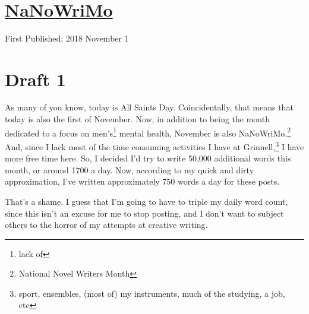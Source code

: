 \documentclass[12pt]{article}[titlepage]
\newcommand{\1}{\={a}}
\newcommand{\2}{\={e}}
\newcommand{\3}{\={\i}}
\newcommand{\4}{\=o}
\newcommand{\5}{\=u}
\newcommand{\6}{\={A}}
\renewcommand{\,}{\textsuperscript{,}}
\begin{document}

\doublespacing
\section{\href{nanowrimo.html}{NaNoWriMo}}
First Published: 2018 November 1
\section{Draft 1}
As many of you know, today is All Saints Day.
Coincidentally, that means that today is also the first of November.
Now, in addition to being the month dedicated to a focus on men's\footnote{lack of} mental health, November is also NaNoWriMo.\footnote{National Novel Writers Month}
And, since I lack most of the time consuming activities I have at Grinnell,\footnote{sport, ensembles, (most of) my instruments, much of the studying, a job, etc} I have more free time here.
So, I  decided I'd try to write 50,000 additional words this month, or around 1700 a day.
Now, according to my quick and dirty approximation, I've written approximately 750 words a day for these posts.

That's a shame.
I guess that I'm going to have to triple my daily word count, since this isn't an excuse for me to stop posting, and I don't want to subject others to the horror of my attempts at creative writing.
\end{document}
